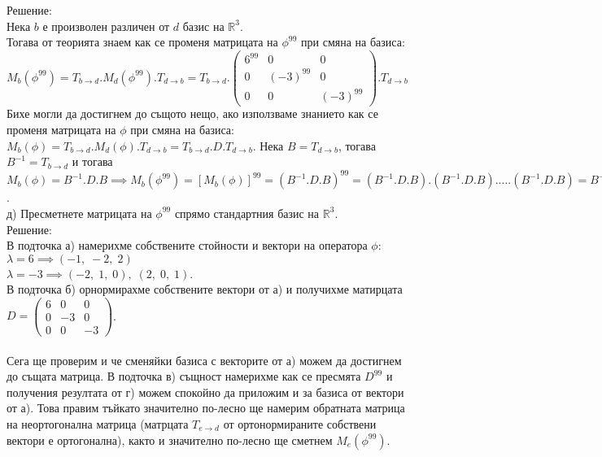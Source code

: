 \documentclass[12pt]{article}
\newcommand{\R}{\mathbb{R}}
\begin{document}
Решение: \\

Нека $b$ е произволен различен от $d$ базис на $\R^3$. \\

Тогава от теорията знаем как се променя матрицата на $\phi^{99}$ при смяна на базиса: \\

$M_b(\phi^{99}) = T_{b \to d}.M_d(\phi^{99}).T_{d \to b} =  T_{b \to d}.\begin{pmatrix}
    6^{99} &  0 &  0 \\
    0 & (-3)^{99} &  0 \\
    0 &  0 & (-3)^{99}
\end{pmatrix}.T_{d \to b}$ \\

Бихе могли да достигнем до същото нещо, ако използваме знанието как се променя матрицата на $\phi$
при смяна на базиса: $M_b(\phi) = T_{b \to d}.M_d(\phi).T_{d \to b} = T_{b \to d}.D.T_{d \to b}$.
Нека $B = T_{d \to b}$, тогава $B^{-1} = T_{b \to d}$ и тогава $M_b(\phi) = B^{-1}.D.B \implies M_b(\phi^{99}) = [M_b(\phi)]^{99} = (B^{-1}.D.B)^{99} = (B^{-1}.D.B).(B^{-1}.D.B).\dots.(B^{-1}.D.B) = B^{-1}.D^{99}.B$. \\

д) Пресметнете матрицата на $\phi^{99}$ спрямо стандартния базис на $\R^3$. \\

Решение: \\

В подточка а) намерихме собствените стойности и вектори на оператора $\phi$: \\

$\lambda = 6 \implies (-1, \; -2, \; 2)$ \\

$\lambda = -3 \implies (-2, \; 1, \; 0), \; (2, \; 0, \; 1)$. \\

В подточка б) орнормирахме собствените вектори от а) и получихме матирцата $D = \begin{pmatrix}
    6 &  0 &  0 \\
    0 & -3 &  0 \\
    0 &  0 & -3
\end{pmatrix}$. \\\\

Сега ще проверим и че сменяйки базиса с векторите от а) можем да достигнем до същата матрица.
В подточка в) същност намерихме как се пресмята $D^{99}$ и получения резултата от г) можем
спокойно да приложим и за базиса от вектори от а). Това правим тъйкато значително по-лесно
ще намерим обратната матрица на неортогонална матрица (матрцата $T_{e \to d}$ от ортонормираните собствени вектори е ортогонална),
както и значително по-лесно ще сметнем $M_e(\phi^{99})$. \\
\end{document}
